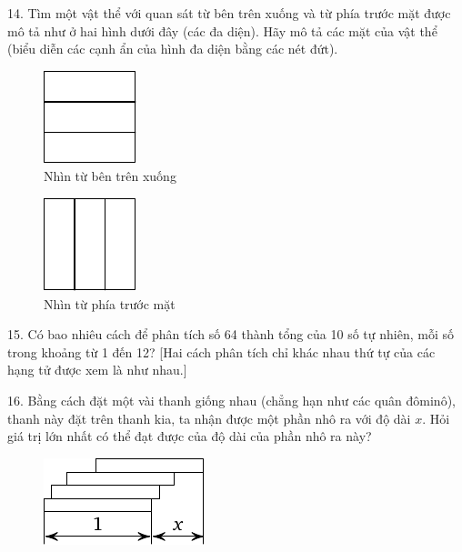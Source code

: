 \begin{problem}{14.}
	Tìm một vật thể với quan sát từ bên trên xuống và từ phía trước mặt được mô tả như ở hai hình dưới đây (các đa diện). Hãy mô tả các mặt của vật thể (biểu diễn các cạnh ẩn của hình đa diện bằng các nét đứt).
	\begin{figure}
		\footnotesize
		\null\hfill
		\parbox{0.2\linewidth}{\centering\includegraphics{resources/taskbook-99}\\Nhìn từ bên trên xuống}
		\hfill
		\parbox{0.2\linewidth}{\centering\includegraphics{resources/taskbook-98}\\Nhìn từ phía trước mặt }
		\hfill\null
	\end{figure}
\end{problem}

\begin{problem}{15.}
	Có bao nhiêu cách để phân tích số 64 thành tổng của 10 số tự nhiên, mỗi số trong khoảng từ 1 đến 12? [Hai cách phân tích chỉ khác nhau thứ tự của các hạng tử được xem là như nhau.]
\end{problem}

\begin{problem}{16.}
	Bằng cách đặt một vài thanh giống nhau (chẳng hạn như các quân đôminô), thanh này đặt trên thanh kia, ta nhận được một phần nhô ra với độ dài $x$. Hỏi giá trị lớn nhất có thể đạt được của độ dài của phần nhô ra này?
	\begin{figure}
		\includegraphics{resources/taskbook-97}
	\end{figure}
\end{problem}

